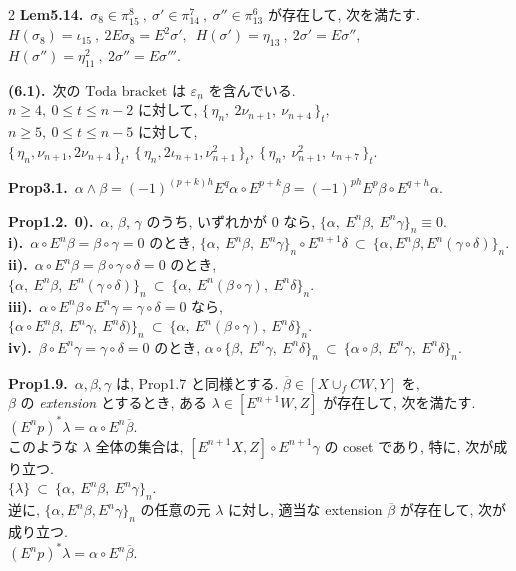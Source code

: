 \documentclass[10pt, leqno]{ltjsarticle}
\newcommand{\Ex}{E}        %
\newcommand{\todai}[2][]{\{\,#2\,\}_{#1}}      %
\numberwithin{equation}{section}
\theoremstyle{plain}
\theoremstyle{definition}
\theoremstyle{remark}
\begin{document}
\begin{paracol}{2}
\noindent
\textbf{Lem5.14.}\
\(\sigma_{8}\in\pi^{8}_{15}\ , \ \sigma'\in\pi^{7}_{14}\ , \ \sigma''\in\pi^{6}_{13}\) 
が存在して, 次を満たす. \\
\(H(\sigma_{8})=\iota_{15} \ ,\ 2E\sigma_{8}=E^{2}\sigma',\)\
\(H(\sigma')=\eta_{13} \ ,\ 2\sigma'=E\sigma'',\)\
\(H(\sigma'')=\eta_{11}^2 \ ,\ 2\sigma''=E\sigma''' .\)

\noindent
\textbf{(6.1).}\ 
\(\text{次の Toda bracket は } \varepsilon_n \text{ を含んでいる. }\quad\)\\
\(n\ge4,\ 0\le t\le n-2\) に対して, 
\(
\todai[t]{\eta_n,\ 2\nu_{n+1},\ \nu_{n+4}},
\)\\
\(n\ge5,\ 0\le t\le n-5\) に対して, \\
\(
\todai[t]{\eta_n, \nu_{n+1}, 2\nu_{n+4}},\
\todai[t]{\eta_n, 2\iota_{n+1}, \nu_{n+1}^2},\
\todai[t]{\eta_n,\ \nu_{n+1}^{2},\ \iota_{n+7}} .
\)

\noindent
\textbf{Prop3.1.}\
\(
\alpha \wedge \beta
= (-1)^{(p+k)h} E^{q}\alpha \circ E^{p+k}\beta
= (-1)^{ph} E^{p}\beta \circ E^{q+h}\alpha .
\)

\noindent
\textbf{Prop1.2.}\
\textbf{0).}\ $\alpha$, $\beta$, $\gamma$ のうち, いずれかが $0$ なら,
\(
\{\alpha,\ \Ex^n\beta,\ \Ex^n\gamma\}_n\equiv0.
\)\\
\textbf{i).}\ $\alpha\circ \Ex^n\beta=\beta\circ\gamma=0$ のとき,
\(
\{\alpha,\ \Ex^n\beta,\ \Ex^n\gamma\}_n\circ\Ex^{n+1}\delta\ \subset\ \{\alpha,\Ex^n \beta, \Ex^n(\gamma\circ\delta)\}_n.
\)\\
\textbf{ii).}\ $\alpha\circ \Ex^n\beta=\beta\circ\gamma\circ\delta=0$ のとき,
\(
\{\alpha,\ \Ex^n\beta,\ \Ex^n(\gamma\circ\delta)\}_n\ \subset\ \{\alpha,\ \Ex^n(\beta\circ\gamma),\ \Ex^n\delta\}_n .
\)\\
\textbf{iii).}\ $\alpha\circ\Ex^n\beta\circ\Ex^n\gamma=\gamma\circ\delta=0$ なら,
\(
\{\alpha\circ\Ex^n\beta,\ \Ex^n\gamma,\ \Ex^n\delta)\}_n\ \subset\ \{\alpha,\ \Ex^n(\beta\circ\gamma),\ \Ex^n\delta\}_n .
\)\\
\textbf{iv).}\ $\beta\circ\Ex^n\gamma=\gamma\circ\delta=0$ のとき,
\(
\alpha\circ\{\beta,\ \Ex^n\gamma,\ \Ex^n\delta\}_n\ \subset\ \{\alpha\circ\beta,\ \Ex^n\gamma,\ \Ex^n\delta\}_n .
\)

\noindent
\textbf{Prop1.9.}\
$\alpha,\beta,\gamma$ は, \textnormal{Prop1.7} と同様とする. 
$\overline\beta\in[X\cup_f CW, Y]$ を,\\
$\beta$ の \emph{extension} とするとき,
ある $\lambda\in[\Ex^{n+1}W, Z]$ が存在して, 次を満たす.\\
\(
(\Ex^n p)^*\lambda=\alpha\circ \Ex^n\overline\beta.
\)\\
このような $\lambda$ 全体の集合は,
\(
[\Ex^{n+1}X, Z]\circ \Ex^{n+1}\gamma
\)
の coset であり, 特に, 次が成り立つ.\\
\(
\{\lambda\}\ \subset\ \{\alpha,\ \Ex^n\beta,\ \Ex^n\gamma\}_n .
\)\\
逆に, $\{\alpha,\Ex^n\beta,\Ex^n\gamma\}_n$ の任意の元 $\lambda$ に対し, 
適当な extension $\overline\beta$ が存在して,
次が成り立つ.\\
\(
(\Ex^n p)^*\lambda=\alpha\circ \Ex^n\overline\beta.
\)








\end{paracol}
\end{document}
